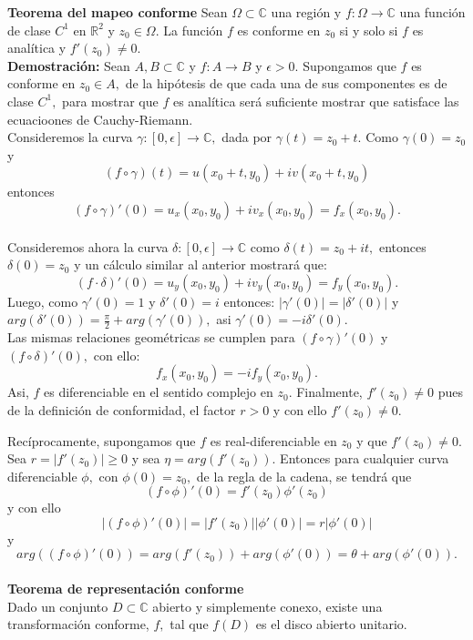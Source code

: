 \documentclass[a4paper]{article}
\begin{document}
\textbf{Teorema del mapeo conforme} Sean $\Omega \subset \mathbb{C}$ una región y $f: \Omega \rightarrow \mathbb{C}$ una función de clase $C^{1}$ en $\mathbb{R}^{2}$ y $z_{0} \in \Omega.$ La función $f$ es conforme en $z_{0}$ si y solo si $f$ es analítica y $f'(z_{0})\neq 0.$ \\
\textbf{Demostración:} Sean $A,B \subset \mathbb{C}$ y $f: A \rightarrow B$ y $\epsilon > 0.$ Supongamos que $f$ es conforme en $z_{0} \in A,$ de la hipótesis de que cada una de sus componentes es de clase $C^{1},$ para mostrar que $f$ es analítica será suficiente mostrar que satisface las ecuacioones de Cauchy-Riemann.\\
Consideremos la curva $\gamma : [0,\epsilon] \rightarrow \mathbb{C},$ dada por $\gamma(t)=z_{0}+t.$ Como $\gamma(0)=z_{0}$ y $$
(f \circ \gamma)(t)=u(x_{0}+t, y_{0})+iv(x_{0}+t, y_{0})$$ entonces $$(f \circ \gamma)'(0)=u_{x}(x_{0}, y_{0})+iv_{x}(x_{0}, y_{0})=f_{x}(x_{0}, y_{0}).$$\\
Consideremos ahora la curva $\delta :[0, \epsilon] \rightarrow \mathbb{C}$ como $\delta(t)=z_{0}+it,$ entonces $\delta(0)=z_{0}$ y un cálculo similar al anterior mostrará que:$$
(f \cdot \delta)'(0)=u_{y}(x_{0}, y_{0})+iv_{y}(x_{0}, y_{0})=f_{y}(x_{0}, y_{0}).$$
Luego, como $\gamma'(0)=1$ y $\delta'(0)=i$ entonces:
$|\gamma'(0)|=|\delta'(0)|$
y
$arg(\delta'(0))=\frac{\pi}{2}+arg(\gamma'(0)),$ asi $
\gamma'(0)=-i\delta'(0).
$\\
Las mismas relaciones geométricas se cumplen para $(f \circ \gamma)'(0)$ y $(f \circ \delta)'(0),$ con ello:
$$
f_{x}(x_{0},y_{0})=-if_{y}(x_{0},y_{0}).
$$ Asi, $f$ es diferenciable en el sentido complejo en $z_{0}.$ Finalmente, $f'(z_{0}) \neq 0$ pues de la definición de conformidad, el factor $r > 0$ y con ello $f'(z_{0})\neq 0.$

Recíprocamente, supongamos que $f$ es real-diferenciable en $z_{0}$ y que $f'(z_{0}) \neq 0.$ Sea $r=|f'(z_{0})| \geq 0$ y sea $\eta=arg(f'(z_{0})).$ Entonces para cualquier curva diferenciable $\phi,$ con $\phi(0)=z_{0},$ de la regla de la cadena, se tendrá que $$
(f \circ \phi)'(0)=f'(z_{0}) \phi'(z_{0})
$$
y con ello $$
|(f \circ \phi)'(0)|=|f'(z_{0})||\phi'(0)|=r|\phi'(0)|
$$ y $$
arg((f \circ \phi)'(0))=arg(f'(z_{0}))+arg(\phi'(0))= \theta +
arg(\phi'(0)).
$$\\

\textbf{Teorema de representación conforme}\\
Dado un conjunto $D \subset \mathbb{C}$ abierto y simplemente conexo, existe una transformación conforme, $f,$ tal que $f(D)$ es el disco abierto unitario.\\
\end{document}
